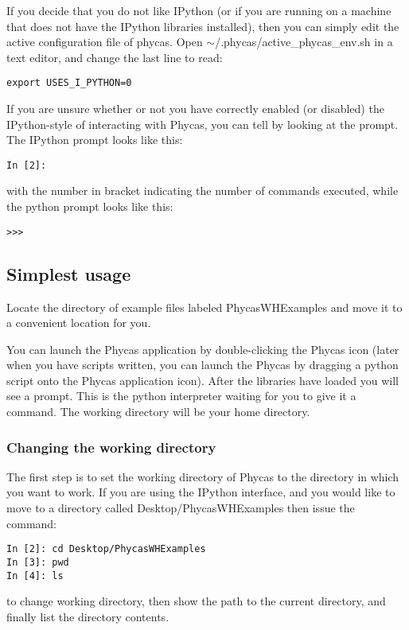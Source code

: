 \documentclass{article}
\newcommand{\phycas}{Phycas\xspace}
\newcommand{\localfile}[1]{\textsf{#1}\xspace}
\begin{document}
If you decide that you do not like IPython (or if you are running on a machine that does not have the IPython libraries installed), then you can simply edit the active configuration file of phycas. 
Open 
\localfile{$\sim$/.phycas/active\_phycas\_env.sh} 
in a text editor, and change the last line to read:
\begin{verbatim}
export USES_I_PYTHON=0
\end{verbatim}

If you are unsure whether or not you have correctly enabled (or disabled) the IPython-style of interacting with \phycas, you can tell by looking at the prompt.
The IPython prompt looks like this:
\begin{verbatim}
In [2]: 
\end{verbatim}
with the number in bracket indicating the number of commands executed, while the python prompt looks like this:
\begin{verbatim}
>>>
\end{verbatim}


\subsection{Simplest usage}
Locate the directory of example files labeled \localfile{PhycasWHExamples} and move it to a convenient location for you.


You can launch the \phycas application by double-clicking the \phycas icon  (later when you have scripts written, you can launch the \phycas by dragging a python script onto the \phycas application icon).
After the libraries have loaded you will see a prompt.
This is the python interpreter waiting for you to give it a command.
The working directory will be your home directory.

\subsubsection{Changing the working directory}
The first step is to set the working directory of \phycas to the directory in which you want to work.
If you are using the IPython interface, and you would like to  move to a directory called \localfile{Desktop/PhycasWHExamples} then issue the command:
\begin{verbatim}
In [2]: cd Desktop/PhycasWHExamples
In [3]: pwd
In [4]: ls
\end{verbatim}
to change working directory, then show the path to the current directory, and finally list the directory contents.
\end{document}
